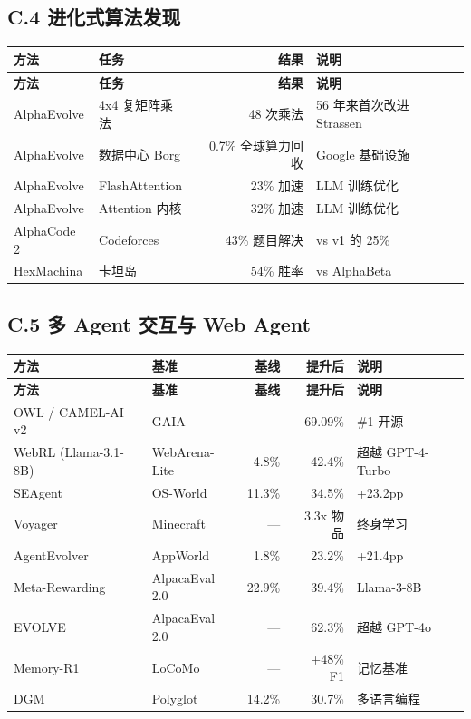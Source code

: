 \subsection*{C.4 进化式算法发现}

\begin{longtable}{p{3.2cm}p{3.5cm}rp{3.5cm}}
\toprule
\textbf{方法} & \textbf{任务} & \textbf{结果} & \textbf{说明} \\
\midrule
\endfirsthead
\toprule
\textbf{方法} & \textbf{任务} & \textbf{结果} & \textbf{说明} \\
\midrule
\endhead
\bottomrule
\endlastfoot

AlphaEvolve & 4x4 复矩阵乘法 & 48 次乘法 & 56 年来首次改进 Strassen \\
AlphaEvolve & 数据中心 Borg & 0.7\% 全球算力回收 & Google 基础设施 \\
AlphaEvolve & FlashAttention & 23\% 加速 & LLM 训练优化 \\
AlphaEvolve & Attention 内核 & 32\% 加速 & LLM 训练优化 \\
AlphaCode 2 & Codeforces & 43\% 题目解决 & vs v1 的 25\% \\
HexMachina & 卡坦岛 & 54\% 胜率 & vs AlphaBeta \\
\end{longtable}

\subsection*{C.5 多 Agent 交互与 Web Agent}

\begin{longtable}{p{3.2cm}p{2.5cm}rrp{2.8cm}}
\toprule
\textbf{方法} & \textbf{基准} & \textbf{基线} & \textbf{提升后} & \textbf{说明} \\
\midrule
\endfirsthead
\toprule
\textbf{方法} & \textbf{基准} & \textbf{基线} & \textbf{提升后} & \textbf{说明} \\
\midrule
\endhead
\bottomrule
\endlastfoot

OWL / CAMEL-AI v2 & GAIA & — & 69.09\% & \#1 开源 \\
WebRL (Llama-3.1-8B) & WebArena-Lite & 4.8\% & 42.4\% & 超越 GPT-4-Turbo \\
SEAgent & OS-World & 11.3\% & 34.5\% & +23.2pp \\
Voyager & Minecraft & — & 3.3x 物品 & 终身学习 \\
AgentEvolver & AppWorld & 1.8\% & 23.2\% & +21.4pp \\
Meta-Rewarding & AlpacaEval 2.0 & 22.9\% & 39.4\% & Llama-3-8B \\
EVOLVE & AlpacaEval 2.0 & — & 62.3\% & 超越 GPT-4o \\
Memory-R1 & LoCoMo & — & +48\% F1 & 记忆基准 \\
DGM & Polyglot & 14.2\% & 30.7\% & 多语言编程 \\
\end{longtable}

